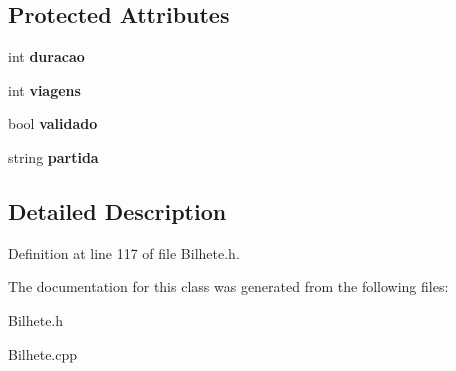 \subsection*{Protected Attributes}
\begin{DoxyCompactItemize}
\item 
\mbox{\label{classOcasional_aedbdd7660405adeb95d3f740e8a677cb}} 
int {\bfseries duracao}
\item 
\mbox{\label{classOcasional_a3b1c0023f2713f848fc5b45a29af61e3}} 
int {\bfseries viagens}
\item 
\mbox{\label{classOcasional_ad34ed7c5440d38076726c0e248ccda68}} 
bool {\bfseries validado}
\item 
\mbox{\label{classOcasional_ace6ef27d88351608d72b8f9bc2a587cf}} 
string {\bfseries partida}
\end{DoxyCompactItemize}


\subsection{Detailed Description}


Definition at line 117 of file Bilhete.\+h.



The documentation for this class was generated from the following files\+:\begin{DoxyCompactItemize}
\item 
Bilhete.\+h\item 
Bilhete.\+cpp\end{DoxyCompactItemize}
